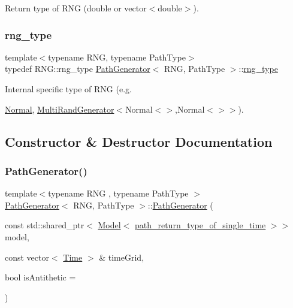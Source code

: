 Return type of R\+NG (double or vector$<$double$>$). 

\hypertarget{class_path_generator_a7e71cbb5376b07b319b1f042a1035335}{}\label{class_path_generator_a7e71cbb5376b07b319b1f042a1035335} 
\subsubsection{\texorpdfstring{rng\+\_\+type}{rng\_type}}
{\footnotesize\ttfamily template$<$typename R\+NG, typename Path\+Type$>$ \\
typedef R\+N\+G\+::rng\+\_\+type \hyperlink{class_path_generator}{Path\+Generator}$<$ R\+NG, Path\+Type $>$\+::\hyperlink{class_path_generator_a7e71cbb5376b07b319b1f042a1035335}{rng\+\_\+type}}



Internal specific type of R\+NG (e.\+g. 

\hyperlink{class_normal}{Normal}, \hyperlink{class_multi_rand_generator}{Multi\+Rand\+Generator}$<$Normal$<$$>$,Normal$<$$>$$>$). 

\subsection{Constructor \& Destructor Documentation}
\hypertarget{class_path_generator_af6c5d75655e077378f702248f84e2920}{}\label{class_path_generator_af6c5d75655e077378f702248f84e2920} 
\subsubsection{\texorpdfstring{Path\+Generator()}{PathGenerator()}}
{\footnotesize\ttfamily template$<$typename R\+NG , typename Path\+Type $>$ \\
\hyperlink{class_path_generator}{Path\+Generator}$<$ R\+NG, Path\+Type $>$\+::\hyperlink{class_path_generator}{Path\+Generator} (\begin{DoxyParamCaption}\item[{const std\+::shared\+\_\+ptr$<$ \hyperlink{class_model}{Model}$<$ \hyperlink{class_path_generator_a467bc3ddaa5e9104170550617e767349}{path\+\_\+return\+\_\+type\+\_\+of\+\_\+single\+\_\+time} $>$$>$}]{model,  }\item[{const vector$<$ \hyperlink{_name_def_8h_ac2d3e0ba793497bcca555c7c2cf64ff3}{Time} $>$ \&}]{time\+Grid,  }\item[{bool}]{is\+Antithetic = {} }\end{DoxyParamCaption})}



